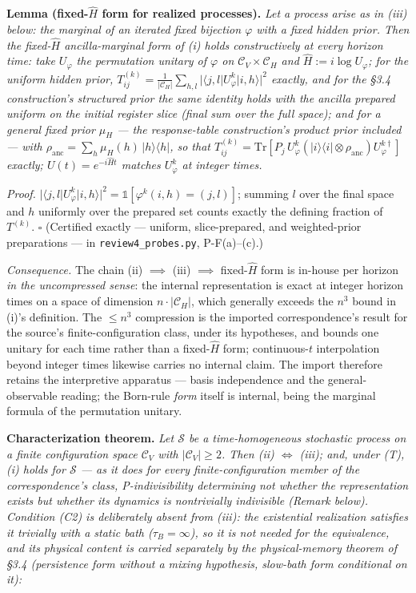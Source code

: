 \documentclass[
]{article}
\begin{document}
\textbf{Lemma (fixed-\(\hat{H}\) form for realized processes).}
\emph{Let a process arise as in (iii) below: the marginal of an iterated
fixed bijection \(\varphi\) with a fixed hidden prior. Then the
fixed-\(\hat{H}\) ancilla-marginal form of (i) holds constructively at
every horizon time: take \(U_\varphi\) the permutation unitary of
\(\varphi\) on \(\mathcal{C}_V \times \mathcal{C}_H\) and
\(\hat{H} := i \log U_\varphi\); for the uniform hidden prior,
\(T^{(k)}_{ij} = \frac{1}{|\mathcal{C}_H|}\sum_{h,l} |\langle j, l| U_\varphi^k |i, h\rangle|^2\)
exactly, and for the §3.4 construction's structured prior the same
identity holds with the ancilla prepared uniform on the initial register
slice (final sum over the full space); and for a general fixed prior
\(\mu_H\) --- the response-table construction's product prior included
--- with \(\rho_{\text{anc}} = \sum_h \mu_H(h)\,|h\rangle\langle h|\),
so that
\(T^{(k)}_{ij} = \mathrm{Tr}[P_j\, U_\varphi^k (|i\rangle\langle i| \otimes \rho_{\text{anc}}) U_\varphi^{k\dagger}]\)
exactly; \(U(t) = e^{-i\hat{H}t}\) matches \(U_\varphi^k\) at integer
times.}

\emph{Proof.}
\(|\langle j,l|U_\varphi^k|i,h\rangle|^2 = \mathbb{1}[\varphi^k(i,h) = (j,l)]\);
summing \(l\) over the final space and \(h\) uniformly over the prepared
set counts exactly the defining fraction of \(T^{(k)}\). \(\square\)
(Certified exactly --- uniform, slice-prepared, and weighted-prior
preparations --- in \texttt{review4\_probes.py}, P-F(a)--(c).)

\emph{Consequence.} The chain (ii) \(\implies\) (iii) \(\implies\)
fixed-\(\hat{H}\) form is in-house per horizon \emph{in the uncompressed
sense}: the internal representation is exact at integer horizon times on
a space of dimension \(n \cdot |\mathcal{C}_H|\), which generally
exceeds the \(n^3\) bound in (i)'s definition. The \(\leq n^3\)
compression is the imported correspondence's result for the source's
finite-configuration class, under its hypotheses, and bounds one unitary
for each time rather than a fixed-\(\hat{H}\) form; continuous-\(t\)
interpolation beyond integer times likewise carries no internal claim.
The import therefore retains the interpretive apparatus --- basis
independence and the general-observable reading; the Born-rule
\emph{form} itself is internal, being the marginal formula of the
permutation unitary.

\textbf{Characterization theorem.} \emph{Let \(\mathcal{S}\) be a
time-homogeneous stochastic process on a finite configuration space
\(\mathcal{C}_V\) with \(|\mathcal{C}_V| \geq 2\). Then (ii) \(\iff\)
(iii); and, under (T), (i) holds for \(\mathcal{S}\) --- as it does for
every finite-configuration member of the correspondence's class,
P-indivisibility determining not whether the representation exists but
whether its dynamics is nontrivially indivisible (Remark below).
Condition (C2) is deliberately absent from (iii): the existential
realization satisfies it trivially with a static bath
(\(\tau_B = \infty\)), so it is not needed for the equivalence, and its
physical content is carried separately by the physical-memory theorem of
§3.4 (persistence form without a mixing hypothesis, slow-bath form
conditional on it):}
\end{document}
